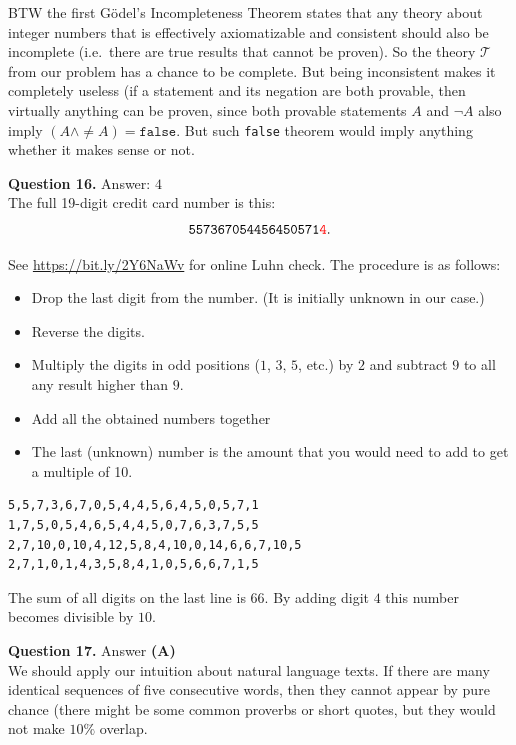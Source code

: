\documentclass[jou]{apa6}
\begin{document}
BTW the first G\"{o}del's Incompleteness Theorem states that any theory about integer numbers that 
is effectively axiomatizable and consistent should also be incomplete 
(i.e.\ there are true results that cannot be proven). So the theory $\mathcal{T}$ from our problem has a chance to 
be complete. But being inconsistent makes it completely useless (if a statement and its negation are
both provable, then virtually anything can be proven, since 
both provable statements $A$ and $\neg A$ also imply 
$(A \wedge \neq A) = \mathtt{false}$. But
such {\tt false} theorem would imply anything \textendash{} whether it makes sense or not.


\vspace{10pt}
{\bf Question 16.} Answer: $4$\\
The full 19-digit credit card number is this: 
$$\mathtt{557367054456450571}\textcolor{red}{\mathtt{4}}.$$

See \url{https://bit.ly/2Y6NaWv} for online Luhn check. 
The procedure is as follows:

\begin{itemize}
\item Drop the last digit from the number. (It is initially unknown in our case.) 
\item Reverse the digits.
\item Multiply the digits in odd positions ($1$, $3$, $5$, etc.) by $2$ and subtract $9$ to all any result higher than $9$. 
\item Add all the obtained numbers together
\item The last (unknown) number is the amount that you would need to add to get a multiple of 10. 
\end{itemize}

\begin{verbatim}
5,5,7,3,6,7,0,5,4,4,5,6,4,5,0,5,7,1 
1,7,5,0,5,4,6,5,4,4,5,0,7,6,3,7,5,5 
2,7,10,0,10,4,12,5,8,4,10,0,14,6,6,7,10,5
2,7,1,0,1,4,3,5,8,4,1,0,5,6,6,7,1,5
\end{verbatim}

The sum of all digits on the last line is $66$. By adding digit $4$ this number becomes divisible by $10$. 






\vspace{10pt}
{\bf Question 17.} Answer {\bf (A)}\\

We should apply our intuition about natural language texts. 
If there are many identical sequences of five consecutive words, then they 
cannot appear by pure chance (there might be some common proverbs or short quotes, 
but they would not make $10\%$ overlap. 
\end{document}
